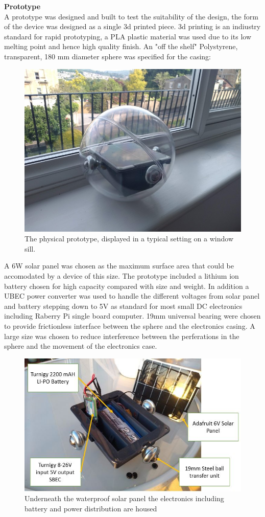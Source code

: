 

\textbf{Prototype}\\

A prototype was designed and built to test the suitability of the design, the form of the device was designed as a single 3d printed piece. 3d printing is an indiustry standard for rapid prototyping, a PLA plastic material was used due to its low melting point and hence high quality finish. An "off the shelf" Polystyrene, transparent, 180 mm diameter sphere was specified for the casing:
\begin{figure}[H]
\centering
\includegraphics[width=0.5\linewidth]{Engineering_hardware/Engineering_hardware_Figures/airm1.JPG}
\caption{The physical prototype, displayed in a typical setting on a window sill.}
\label{fig:15cm_shell_loading}
\end{figure}

A 6W solar panel was chosen as the maximum surface area that could be accomodated by a device of this size. The prototype included a lithium ion battery chosen for high capacity compared with size and weight. In addition a UBEC power converter was used to handle the different voltages from solar panel and battery stepping down to 5V as standard for most small DC electronics including Raberry Pi single board computer. 19mm universal bearing were chosen to provide frictionless interface between the sphere and the electronics casing. A large size was chosen to reduce interference between the perferations in the sphere and the movement of the electronics case. 

\begin{figure}[H]
\centering
\includegraphics[width=0.5\linewidth]{Engineering_hardware/Engineering_hardware_Figures/prototype_pic_1.JPG}
\caption{Underneath the waterproof solar panel the electronics including battery and power distribution are housed }
\label{fig:15cm_shell_loading}
\end{figure}

